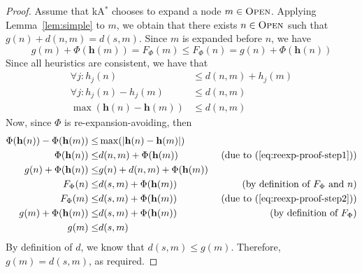 \documentclass[smallextended]{svjour3}       %
\newcommand{\omspp}{\ac{OMSPP}\xspace}
\newcommand{\kastar}{kA$^*$\xspace}
\newcommand{\kastarphi}{\textup{kA}$^*_{\Phi}$\xspace}
\newcommand{\open}{\textsc{Open}\xspace}
\newcommand{\axiomreexp}{re-expansion-avoiding\xspace}
\newcommand{\vect}[1]{\mathbf{#1}}
\begin{document}

\bestg*
\begin{proof}
Assume that \kastar chooses to expand a node $m \in \open$. 
  Applying Lemma~\ref{lem:simple} to $m$, we obtain that there exists $n\in \open$ such that $g(n) + d(n, m) = d(s, m)$. 
  Since $m$ is expanded before $n$, we have 
  \begin{equation}
      g(m) + \Phi(\vect{h}(m)) = F_\Phi(m) \leq F_\Phi(n) = g(n) + \Phi(\vect{h}(n))
      \label{eq:reexp-proof-step2}
  \end{equation}
    Since all heuristics are consistent, we have that
  \begin{align}
  \forall j: h_j(n)                    &   \leq d(n, m) + h_j(m)   \\
  \forall j:  h_j(n) - h_j(m)          &   \leq d(n, m) \\
  \max(\vect{h}(n) - \vect{h}(m))      &   \leq d(n, m) \label{eq:reexp-proof-step1}
\end{align}
Now, since $\Phi$ is \axiomreexp, then 
\begin{align}
    \Phi(\vect{h}(n)) - \Phi(\vect{h}(m))\leq  & \max(|\vect{h}(n)-\vect{h}(m)|) & \\
    \Phi(\vect{h}(n))  \leq & d(n, m) + \Phi(\vect{h}(m)) & \text{ (due to (\ref{eq:reexp-proof-step1}))}\\
    g(n) + \Phi(\vect{h}(n))           \leq & g(n)+ d(n, m) + \Phi(\vect{h}(m)) & \\
    F_\Phi(n)           \leq & d(s, m) + \Phi(\vect{h}(m)) &
    \text{(by definition of $F_\Phi$ and $n$)}\\
    F_\Phi(m)           \leq & d(s, m) + \Phi(\vect{h}(m)) &
    \text{(due to (\ref{eq:reexp-proof-step2}))}\\
    g(m) + \Phi(\vect{h}(m))           \leq & d(s, m) + \Phi(\vect{h}(m)) & \text{(by definition of $F_\Phi$)}\\
    g(m)                \leq & d(s, m) & 
\end{align} 
By definition of $d$, we know that $d(s, m)\leq g(m)$.
Therefore, $g(m)=d(s,m)$, as required.
\end{proof}
\end{document}
